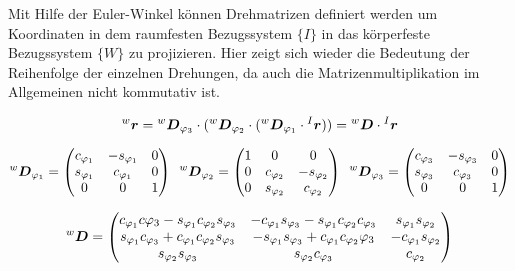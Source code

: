 Mit Hilfe der Euler-Winkel können Drehmatrizen definiert werden um Koordinaten in dem raumfesten Bezugssystem $\{I\}$ in das körperfeste Bezugssystem $\{W\}$ zu projizieren. Hier zeigt sich wieder die Bedeutung der Reihenfolge der einzelnen Drehungen, da auch die Matrizenmultiplikation im Allgemeinen nicht kommutativ ist.

\begin{equation}
\prescript{w}{}{}\boldsymbol{r} = \prescript{w}{}{}\boldsymbol{D}_{\varphi_3} \cdot ( \prescript{w}{}{}\boldsymbol{D}_{\varphi_2} \cdot ( \prescript{w}{}{}\boldsymbol{D}_{\varphi_1} \cdot \prescript{I}{}{}\boldsymbol{r} )) = \prescript{w}{}{}\boldsymbol{D} \cdot \prescript{I}{}{}\boldsymbol{r}
\end{equation}

\begin{equation}
\prescript{w}{}{}\boldsymbol{D}_{\varphi_1} = \begin{pmatrix}
c_{\varphi_1} & -s_{\varphi_1} & 0 \\
s_{\varphi_1} & c_{\varphi_1} & 0 \\
0 & 0 & 1
\end{pmatrix}
\hspace{5pt}
\prescript{w}{}{}\boldsymbol{D}_{\varphi_2} = \begin{pmatrix}
1 & 0 & 0 \\
0 & c_{\varphi_2} & -s_{\varphi_2} \\
0 & s_{\varphi_2} & c_{\varphi_2}
\end{pmatrix}
\hspace{5pt}
\prescript{w}{}{}\boldsymbol{D}_{\varphi_3} = \begin{pmatrix}
c_{\varphi_3} & -s_{\varphi_3} & 0  \\
s_{\varphi_3} & c_{\varphi_3} & 0 \\
0 & 0 & 1
\end{pmatrix}
\end{equation}

\begin{equation}
\prescript{w}{}{}\boldsymbol{D} = \begin{pmatrix}
c_{\varphi_1}c{\varphi_3} - s_{\varphi_1}c_{\varphi_2}s_{\varphi_3} &
-c_{\varphi_1}s_{\varphi_3} - s_{\varphi_1}c_{\varphi_2}c_{\varphi_3} &
s_{\varphi_1}s_{\varphi_2} \\
s_{\varphi_1}c_{\varphi_3}+c_{\varphi_1}c_{\varphi_2}s_{\varphi_3} &
-s_{\varphi_1}s_{\varphi_3}+c_{\varphi_1}c_{\varphi_2}{\varphi_3} &
-c_{\varphi_1}s_{\varphi_2} \\
s_{\varphi_2}s_{\varphi_3} &
s_{\varphi_2}c_{\varphi_3} &
c_{\varphi_2}
\end{pmatrix}
\end{equation}

